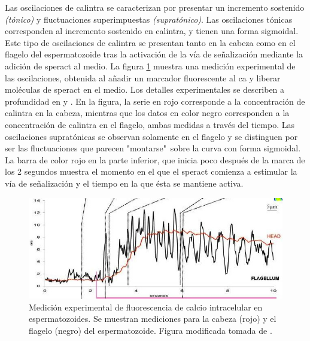 Las oscilaciones de \ac{calintra} se caracterizan por presentar un incremento sostenido \emph{(tónico)} y fluctuaciones superimpuestas \emph{(supratónico)}. Las oscilaciones tónicas corresponden al incremento sostenido en \ac{calintra}, y tienen una forma sigmoidal. Este tipo de oscilaciones de \ac{calintra} se presentan tanto en la cabeza como en el flagelo del espermatozoide tras la activación de la vía de señalización mediante la adición de speract al medio. La figura \ref{fig:fluorescencia} muestra una medición experimental de las oscilaciones, obtenida al añadir un marcador fluorescente al \ac{ca} y liberar moléculas de speract en el medio. Los detalles experimentales se describen a profundidad en \citeauthor{Darszon2008} \citep{Darszon2008} y \citeauthor{Wood2007} \citep{Wood2007}. En la figura, la serie en rojo corresponde a la concentración de \ac{calintra} en la cabeza, mientras que los datos en color negro corresponden a la concentración de \ac{calintra} en el flagelo, ambas medidas a través del tiempo. Las oscilaciones supratónicas se observan solamente en el flagelo y se distinguen por ser las fluctuaciones que parecen "montarse"\ sobre la curva con forma sigmoidal. La barra de color rojo en la parte inferior, que inicia poco después de la marca de los 2 segundos muestra el momento en el que el speract comienza a estimular la vía de señalización y el tiempo en la que ésta se mantiene activa.


\begin{figure}[hbt]
\includegraphics[width=0.9\linewidth]{gfx/maderaSperact}
\caption[Medición experimental de calcio intracelular]{Medición experimental de fluorescencia de calcio intracelular en espermatozoides. Se muestran mediciones para la cabeza (rojo) y el flagelo (negro) del espermatozoide. %
Figura modificada tomada de \citeauthor{Wood:2003p4517} \citep{Wood:2003p4517}.}\label{fig:fluorescencia}
\end{figure}

